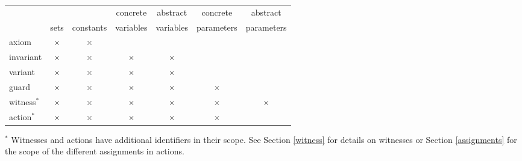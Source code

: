 \begin{center}
  \newcommand{\markcell}{$\times$}
  \begin{tabular}{lcccccc}
  \hline
            &           &           & concrete  & abstract  & concrete   & abstract \\
            & sets      & constants & variables & variables & parameters & parameters \\
  \hline
  axiom     & \markcell & \markcell &           &           &            & \\
  invariant & \markcell & \markcell & \markcell & \markcell &            & \\
  variant   & \markcell & \markcell & \markcell & \markcell &            & \\
  guard     & \markcell & \markcell & \markcell & \markcell & \markcell  & \\
  witness$^{*}$   & \markcell & \markcell & \markcell & \markcell & \markcell  & \markcell \\
  action$^{*}$    & \markcell & \markcell & \markcell & \markcell & \markcell  &  \\
  \hline
  \end{tabular}    
\end{center}

$\mbox{}^{*}$ Witnesses and actions have additional identifiers in their scope.
See Section \ref{witness} for details on witnesses or Section \ref{assignments} for the scope of the different assignments in actions.

